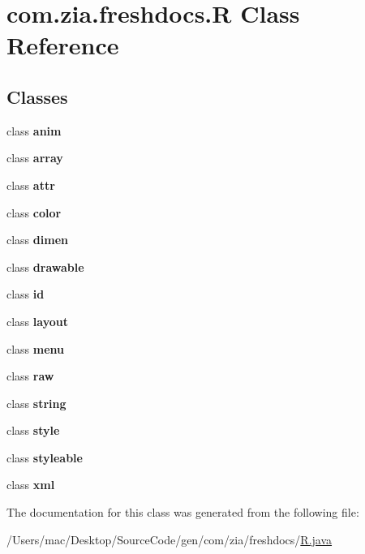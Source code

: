 \hypertarget{classcom_1_1zia_1_1freshdocs_1_1_r}{\section{com.\-zia.\-freshdocs.\-R Class Reference}
\label{classcom_1_1zia_1_1freshdocs_1_1_r}
}
\subsection*{Classes}
\begin{DoxyCompactItemize}
\item 
class {\bfseries anim}
\item 
class {\bfseries array}
\item 
class {\bfseries attr}
\item 
class {\bfseries color}
\item 
class {\bfseries dimen}
\item 
class {\bfseries drawable}
\item 
class {\bfseries id}
\item 
class {\bfseries layout}
\item 
class {\bfseries menu}
\item 
class {\bfseries raw}
\item 
class {\bfseries string}
\item 
class {\bfseries style}
\item 
class {\bfseries styleable}
\item 
class {\bfseries xml}
\end{DoxyCompactItemize}


The documentation for this class was generated from the following file\-:\begin{DoxyCompactItemize}
\item 
/\-Users/mac/\-Desktop/\-Source\-Code/gen/com/zia/freshdocs/\hyperlink{_r_8java}{R.\-java}\end{DoxyCompactItemize}
